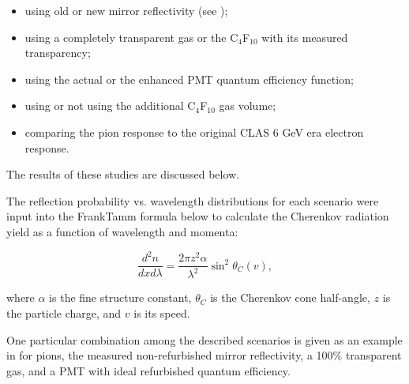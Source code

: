\begin{itemize}
	\item using old or new mirror reflectivity (see );
	\item using a completely transparent gas or the C$_4$F$_{10}$ with its measured transparency;
	\item using the actual or the enhanced PMT quantum efficiency function;
	\item using or not using the additional C$_4$F$_{10}$ gas volume;
	\item comparing the pion response to the original CLAS 6 GeV era electron response.
\end{itemize}
\noindent
The results of these studies are discussed below.

The reflection probability vs. wavelength distributions for each scenario were input into
the Frank\textendash Tamm formula \cite{Frank:1937fk} below to calculate
the Cherenkov radiation yield as a function of wavelength and momenta:


\begin{equation} \label{eq:cerenkov}
	\frac{d^2n}{dxd\lambda} = \frac{2\pi z^2\alpha}{\lambda^2}\sin^2{\theta_C(v)},
\end{equation}

\noindent
where $\alpha$ is the fine structure constant, $\theta_C$ is the Cherenkov cone half-angle, $z$ is the particle
charge, and $v$ is its speed.

One particular combination among the described scenarios is given as an example in  for pions,
the measured non-refurbished mirror reflectivity, a 100$\%$ transparent gas, and a PMT with ideal refurbished quantum efficiency.

